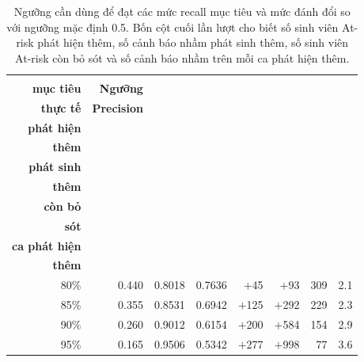 \begin{table}[H]
  \centering
  \caption{Ngưỡng cần dùng để đạt các mức recall mục tiêu và mức đánh đổi so với ngưỡng mặc định 0.5. Bốn cột cuối lần lượt cho biết số sinh viên At-risk phát hiện thêm, số cảnh báo nhầm phát sinh thêm, số sinh viên At-risk còn bỏ sót và số cảnh báo nhầm trên mỗi ca phát hiện thêm.}
  \label{tab:target_recall}
  \scriptsize
  \setlength{\tabcolsep}{2pt}
  \begin{tabular}{@{}rrrrrrrr@{}}
    \toprule
    \makecell{\textbf{Recall}\\\textbf{mục tiêu}} &
    \textbf{Ngưỡng} &
    \makecell{\textbf{Recall}\\\textbf{thực tế}} &
    \textbf{Precision} &
    \makecell{\textbf{At-risk}\\\textbf{phát hiện}\\\textbf{thêm}} &
    \makecell{\textbf{Cảnh báo nhầm}\\\textbf{phát sinh}\\\textbf{thêm}} &
    \makecell{\textbf{At-risk}\\\textbf{còn bỏ}\\\textbf{sót}} &
    \makecell{\textbf{Cảnh báo nhầm/}\\\textbf{ca phát hiện}\\\textbf{thêm}} \\
    \midrule
    80\% & 0.440 & 0.8018 & 0.7636 & $+$45 & $+$93 & 309 & 2.1 \\
    85\% & 0.355 & 0.8531 & 0.6942 & $+$125 & $+$292 & 229 & 2.3 \\
    90\% & 0.260 & 0.9012 & 0.6154 & $+$200 & $+$584 & 154 & 2.9 \\
    95\% & 0.165 & 0.9506 & 0.5342 & $+$277 & $+$998 & 77 & 3.6 \\
    \bottomrule
  \end{tabular}
\end{table}
